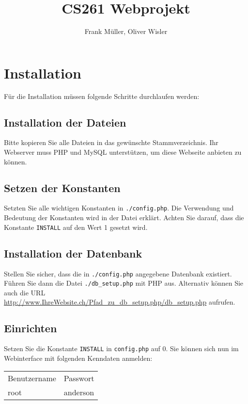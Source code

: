 \documentclass[ngerman, 12pt, pdftex]{scrartcl}[2006/07/30]
\title{CS261 Webprojekt}
\author{Frank Müller, Oliver Wisler}
\begin{document}
\pagestyle{fancy}
\fancyhf{} 
\renewcommand{\headrulewidth}{0.1pt} 	%
\fancyfoot[C]{\thepage} 				%




\tableofcontents
\newpage


\section{Installation}

Für die Installation müssen folgende Schritte durchlaufen werden:
\subsection{Installation der Dateien}
    Bitte kopieren Sie alle Dateien in das gewünschte Stammverzeichnis.
    Ihr Webserver muss PHP und MySQL unterstützen, um diese Webseite anbieten zu können.
\subsection{Setzen der Konstanten}
    Setzten Sie alle wichtigen Konstanten in \verb+./config.php+.
    Die Verwendung und Bedeutung der Konstanten wird in der Datei erklärt.
    Achten Sie darauf, dass die Konstante \verb+INSTALL+ auf den Wert 1 gesetzt wird.
\subsection{Installation der Datenbank} %
\label{sub:Installation der Datenbank}
    Stellen Sie sicher, dass die in  \verb+./config.php+ angegebene Datenbank existiert.
    Führen Sie dann die Datei  \verb+./db_setup.php+ mit PHP aus. Alternativ können Sie auch 
    die URL  \url{http://www.IhreWebsite.ch/Pfad_zu_db_setup.php/db_setup.php} aufrufen.
\subsection{Einrichten} %
\label{sub:Einrichten}
    Setzen Sie die Konstante \verb+INSTALL+ in \verb+config.php+ auf 0.
    Sie können sich nun im Webinterface mit folgenden Kenndaten anmelden: \\
    \begin{center}
    \begin{tabular}{ll}
        Benutzername & Passwort \\
        root & anderson \\
    \end{tabular}
    \end{center}
\end{document}
